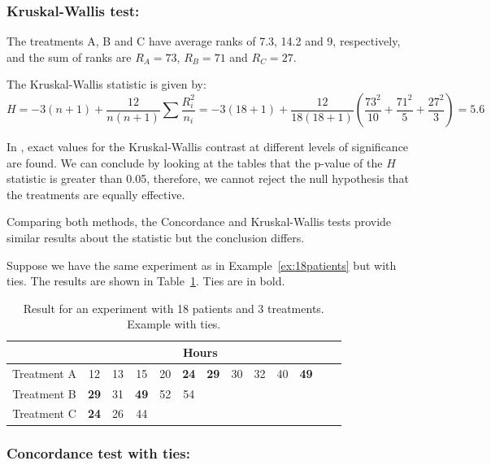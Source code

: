\subsubsection{Kruskal-Wallis test:}

The treatments A, B and C have average ranks of 7.3, 14.2 and 9, respectively, and the sum of ranks are $R_A=73$, $R_B=71$ and $R_C=27$. 

The Kruskal-Wallis statistic is given by:
$$H = -3(n+1)+\frac{12}{n(n+1)}\sum \frac{R_i^2}{n_i}= -3(18+1)+\frac{12}{18(18+1)}\left( \frac{73^2}{10} +\frac{71^2}{5}+\frac{27^2}{3}\right)=5.6$$

In \cite{Meyer2015}, exact values for the Kruskal-Wallis contrast at different levels of significance are found. We can conclude by looking at the tables that the p-value of the $H$ statistic is greater than 0.05, therefore, we cannot reject the null hypothesis that the treatments are equally effective.

Comparing both methods, the Concordance and Kruskal-Wallis tests provide similar results about the statistic but the conclusion differs. 


\begin{exmp} \label{ex:3} Suppose we have the same experiment as in Example~\ref{ex:18patients} but with ties. The results are shown in Table~\ref{t:example3}. Ties are in bold.\\

\begin{table}[h] \centering
\begin{tabular}{ccccccccccccc} \toprule
 & \multicolumn{10}{c}{Hours}\\ \hline
Treatment A & 12 & 13 & 15 & 20& {\bf 24} & {\bf 29} & 30 & 32 & 40 & {\bf 49} \\ \hline
Treatment B & {\bf 29}& 31& {\bf 49} & 52 & 54 & & & & & \\ \hline
Treatment C & {\bf 24} & 26 & 44 & & & & & & &\\ \bottomrule[0.2mm]
\end{tabular}
 \caption{Result for an experiment with 18 patients and 3 treatments. Example with ties.}
  \label{t:example3}
\end{table}
\end{exmp}


\subsubsection{Concordance test with ties:}

